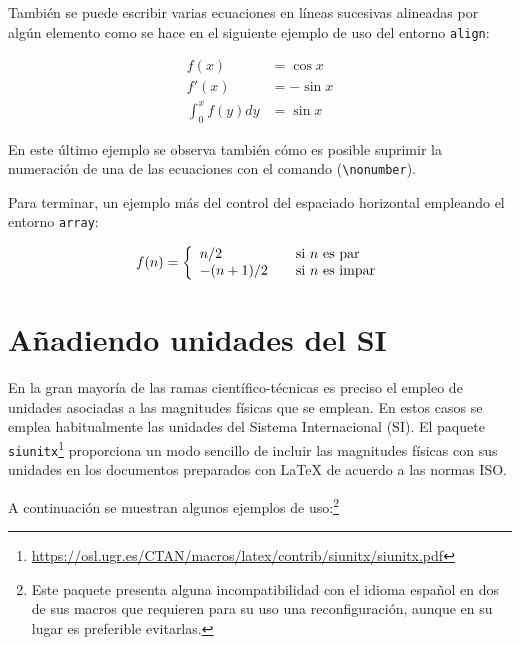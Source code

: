 \documentclass[11pt,a4paper]{article}
\begin{document}
También se puede escribir varias ecuaciones en líneas sucesivas alineadas por algún elemento como se hace en el siguiente ejemplo de uso del entorno \texttt{align}:

\begin{align}
f(x) & = \cos x \\
f'(x) & = -\sin x \\
\int_{0}^{x} f(y)dy & = \sin x \nonumber
\end{align}

\noindent En este último ejemplo se observa también cómo es posible suprimir la numeración de una de las ecuaciones con el comando (\texttt{\textbackslash nonumber}).

Para terminar, un ejemplo más del control del espaciado horizontal empleando el entorno \texttt{array}:

\[f(n) = \left\{ 
\begin{array}{l l}
  n/2 & \quad \mbox{si $n$ es par}\\
  -(n+1)/2 & \quad \mbox{si $n$ es impar}\\ \end{array} \right. \]


\section{Añadiendo unidades del SI}
En la gran mayoría de las ramas científico-técnicas es preciso el empleo de unidades asociadas a las magnitudes físicas que se emplean. En estos casos se emplea habitualmente las unidades del Sistema Internacional (SI). El paquete \texttt{siunitx}\footnote{\url{https://osl.ugr.es/CTAN/macros/latex/contrib/siunitx/siunitx.pdf}} proporciona un modo sencillo de incluir las magnitudes físicas con sus unidades en los documentos preparados con \LaTeX{} de acuerdo a las normas ISO.

A continuación se muestran algunos ejemplos de uso:\footnote{Este paquete presenta alguna incompatibilidad con el idioma español en dos de sus macros que requieren para su uso una reconfiguración, aunque en su lugar es preferible evitarlas.}
\end{document}
